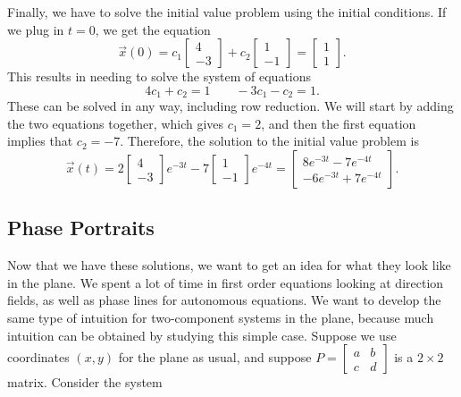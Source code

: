 \documentclass{ximera}
\begin{document}
\begin{exampleSol}
    Finally, we have to solve the initial value problem using the initial conditions. If we plug in $t=0$, we get the equation
    \begin{equation*}
        \vec{x}(0) = c_1 \begin{bmatrix} 4 \\ -3 \end{bmatrix} + c_2 \begin{bmatrix} 1 \\ -1 \end{bmatrix} = \begin{bmatrix} 1 \\ 1 \end{bmatrix}.
    \end{equation*}
    This results in needing to solve the system of equations
    \begin{equation*}
        4c_1 + c_2 = 1 \qquad -3c_1 - c_2 = 1.
    \end{equation*}
    These can be solved in any way, including row reduction. We will start by adding the two equations together, which gives $c_1 = 2$, and then the first equation implies that $c_2 = -7$. Therefore, the solution to the initial value problem is
    \begin{equation*}
        \vec{x}(t) = 2 \begin{bmatrix} 4 \\ -3 \end{bmatrix}e^{-3t}  - 7 \begin{bmatrix} 1 \\ -1 \end{bmatrix}e^{-4t} = \begin{bmatrix} 8e^{-3t} - 7e^{-4t} \\ -6e^{-3t} + 7e^{-4t} \end{bmatrix}.
    \end{equation*}
\end{exampleSol}

\subsection{Phase Portraits}

Now that we have these solutions, we want to get an idea for what they look like in the plane. We spent a lot of time in first order equations looking at direction fields, as well as phase lines for autonomous equations. We want to develop the same type of intuition for two-component systems in the plane, because much intuition can be obtained by studying this simple case. Suppose we use coordinates $(x,y)$ for the plane as usual, and suppose $P = \left[ \begin{smallmatrix} a & b \\ c & d \end{smallmatrix} \right]$ is a $2 \times 2$ matrix.  Consider the system
\end{document}
